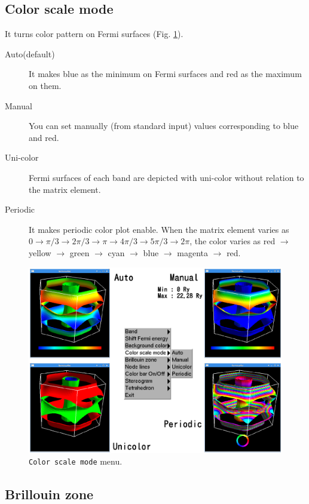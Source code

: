 \documentclass[12pt]{article}
\begin{document}
\subsection{Color scale mode}

It turns color pattern on Fermi surfaces (Fig. \ref{fig_colorscale}). 
\begin{description}
\item[Auto(default)] 
  It makes blue as the minimum on Fermi surfaces and
  red as the maximum on them.
\item[Manual] You can set manually (from standard input) 
  values corresponding to blue and red.
\item[Uni-color] Fermi surfaces of each band are depicted with uni-color
  without relation to the matrix element.
\item[Periodic] It makes periodic color plot enable.
  When the matrix element varies as 
  $0 \rightarrow \pi/3 \rightarrow 2\pi/3 \rightarrow \pi \rightarrow 
  4\pi/3 \rightarrow 5\pi/3 \rightarrow 2\pi$,
  the color varies as 
  red $\rightarrow$ yellow $\rightarrow$ green $\rightarrow$
  cyan $\rightarrow$ blue $\rightarrow$ magenta $\rightarrow$ red. 
\end{description}

\begin{figure}[!ht]
  \includegraphics[width=17cm]{figs/colorscale.eps}
  \caption{\texttt{Color scale mode} menu.}
  \label{fig_colorscale}
\end{figure}

\subsection{Brillouin zone}
\end{document}
